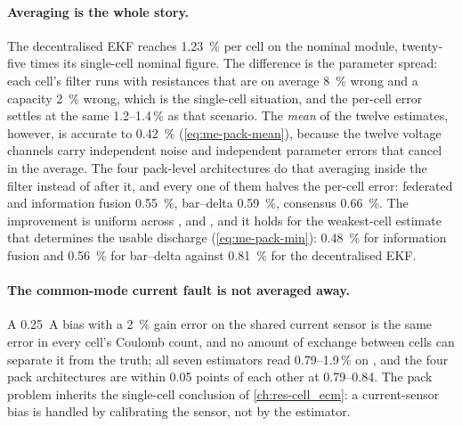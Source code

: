 \paragraph{Averaging is the whole story.} The decentralised EKF reaches \SI{1.23}{\percent} per
cell on the nominal module, twenty-five times its single-cell nominal figure. The difference is
the parameter spread: each cell's filter runs with resistances that are on average
\SI{8}{\percent} wrong and a capacity \SI{2}{\percent} wrong, which is the single-cell
 situation, and the per-cell error settles at the same
\num{1.2}--\num{1.4}\,\% as that scenario. The \emph{mean} of the twelve estimates, however, is
accurate to \SI{0.42}{\percent} (\cref{eq:me-pack-mean}), because the twelve voltage channels
carry independent noise and independent parameter errors that cancel in the average. The four
pack-level architectures do that averaging inside the filter instead of after it, and every one
of them halves the per-cell error: federated and information fusion \SI{0.55}{\percent},
bar--delta \SI{0.59}{\percent}, consensus \SI{0.66}{\percent}. The improvement is uniform across
,  and , and it holds for the weakest-cell
estimate that determines the usable discharge (\cref{eq:me-pack-min}): \SI{0.48}{\percent}
for information fusion and \SI{0.56}{\percent} for bar--delta against \SI{0.81}{\percent} for
the decentralised EKF.

\paragraph{The common-mode current fault is not averaged away.} A \SI{0.25}{\ampere} bias with
a \SI{2}{\percent} gain error on the shared current sensor is the same error in every cell's
Coulomb count, and no amount of exchange between cells can separate it from the truth; all
seven estimators read \num{0.79}--\num{1.9}\,\% on , and the four pack
architectures are within \num{0.05} points of each other at \num{0.79}--\num{0.84}. The pack
problem inherits the single-cell conclusion of \cref{ch:res-cell_ecm}: a current-sensor bias is
handled by calibrating the sensor, not by the estimator.


